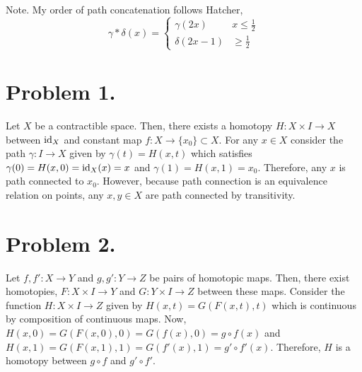 \documentclass[12pt]{extarticle}
\begin{document}

Note. My order of path concatenation follows Hatcher,
\[\gamma * \delta(x) = \begin{cases}
\gamma(2x) & x \le \tfrac{1}{2} \\
\delta(2x - 1) & \ge \tfrac{1}{2}
\end{cases}\]
 
\section*{Problem 1.}
Let $X$ be a contractible space. Then, there exists a homotopy $H : X \times I \to X$ between $\mathrm{id}_X$ and constant map $f : X \to \{x_0\} \subset X$. For any $x \in X$ consider the path $\gamma : I \to X$ given by $\gamma(t) = H(x, t)$ which satisfies $\gamma(0) = H(x, 0) = \mathrm{id}_X(x) = x$ and $\gamma(1) = H(x, 1) = x_0$. Therefore, any $x$ is path connected to $x_0$. However, because path connection is an equivalence relation on points, any $x, y \in X$ are path connected by transitivity.  

\section*{Problem 2.}
Let $f, f' : X \to Y$ and $g, g' : Y \to Z$ be pairs of homotopic maps. Then, there exist homotopies, $F : X \times I \to Y$ and $G : Y \times I \to Z$ between these maps. Consider the function $H : X \times I \to Z$ given by $H(x, t) = G(F(x, t), t)$ which is continuous by composition of continuous maps. Now, $H(x, 0) = G(F(x, 0), 0) = G(f(x), 0)  = g \circ f (x)$ and $H(x, 1) = G(F(x, 1), 1) = G(f'(x), 1) = g' \circ f'(x)$. Therefore, $H$ is a homotopy between $g \circ f$ and $g' \circ f'$.  
\end{document}
